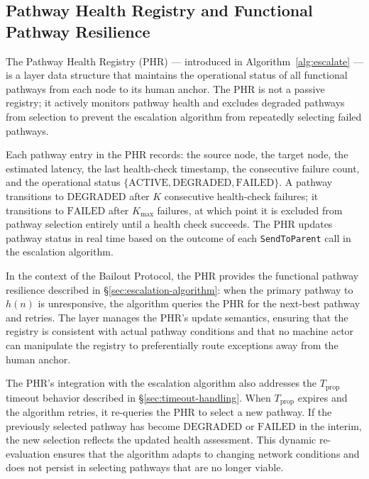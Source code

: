 \subsection{Pathway Health Registry and Functional Pathway Resilience}

The Pathway Health Registry (PHR) — introduced in Algorithm~\ref{alg:escalate} — is a \fact{} layer data structure that maintains the operational status of all functional pathways from each node to its human anchor. The PHR is not a passive registry; it actively monitors pathway health and excludes degraded pathways from selection to prevent the escalation algorithm from repeatedly selecting failed pathways.

Each pathway entry in the PHR records: the source node, the target node, the estimated latency, the last health-check timestamp, the consecutive failure count, and the operational status $\{\text{ACTIVE}, \text{DEGRADED}, \text{FAILED}\}$. A pathway transitions to $\text{DEGRADED}$ after $K$ consecutive health-check failures; it transitions to $\text{FAILED}$ after $K_{\max}$ failures, at which point it is excluded from pathway selection entirely until a health check succeeds. The PHR updates pathway status in real time based on the outcome of each \texttt{SendToParent} call in the escalation algorithm.

In the context of the Bailout Protocol, the PHR provides the functional pathway resilience described in \S\ref{sec:escalation-algorithm}: when the primary pathway to $h(n)$ is unresponsive, the algorithm queries the PHR for the next-best pathway and retries. The \fact{} layer manages the PHR's update semantics, ensuring that the registry is consistent with actual pathway conditions and that no machine actor can manipulate the registry to preferentially route exceptions away from the human anchor.

The PHR's integration with the escalation algorithm also addresses the $T_{\text{prop}}$ timeout behavior described in \S\ref{sec:timeout-handling}. When $T_{\text{prop}}$ expires and the algorithm retries, it re-queries the PHR to select a new pathway. If the previously selected pathway has become $\text{DEGRADED}$ or $\text{FAILED}$ in the interim, the new selection reflects the updated health assessment. This dynamic re-evaluation ensures that the algorithm adapts to changing network conditions and does not persist in selecting pathways that are no longer viable.

